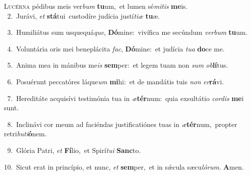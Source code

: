 \lettrine{\initial\textcolor{\initialcolor}{L}}{ucérna} pédibus meis ver\textit{bum} \textbf{tu}\-um,~\star et lumen sé\-\textit{mi}\-\textit{tis} \textbf{me}\-is.\\
{\numbfont\textcolor{\numbcolor}{~2.}}~Jurávi, \textit{et} \textbf{stá}\-tui~\star custodíre judícia justí\-\textit{ti}\-\textit{æ} \textbf{tu}\-æ.\par
{\numbfont\textcolor{\numbcolor}{~3.}}~Humiliátus sum usquequá\-\textit{que}\-, \textbf{Dó}\-mine:~\star vivífica me secúndum \textit{ver}\-\textit{bum} \textbf{tu}\-um.\par
{\numbfont\textcolor{\numbcolor}{~4.}}~Voluntária oris mei beneplácita \textit{fac}\-, \textbf{Dó}\-mine:~\star et judícia \textit{tu}\-\textit{a} \textbf{do}\-ce me.\par
{\numbfont\textcolor{\numbcolor}{~5.}}~Anima mea in mánibus me\textit{is} \textbf{sem}\-per:~\star et legem tuam non \textit{sum} \textit{ob}\-\textbf{lí}tus.\par
{\numbfont\textcolor{\numbcolor}{~6.}}~Posuérunt peccatóres láque\textit{um} \textbf{mi}\-hi:~\star et de mandátis tuis \textit{non} \textit{er}\-\textbf{rá}vi.\par
{\numbfont\textcolor{\numbcolor}{~7.}}~Hereditáte acquisívi testimónia tua in \textit{æ}\-\textbf{tér}num:~\star quia exsultátio \textit{cor}\-\textit{dis} \textbf{me}\-i sunt.\par
{\numbfont\textcolor{\numbcolor}{~8.}}~Inclinávi cor meum ad faciéndas justificatiónes tuas in \textit{æ}\-\textbf{tér}num,~\star propter retri\-\textit{bu}\-\textit{ti}\textbf{ó}nem.\par
{\numbfont\textcolor{\numbcolor}{~9.}}~Glória Patri, \textit{et} \textbf{Fí}\-lio,~\star et Spirí\-\textit{tu}\-\textit{i} \textbf{Sanc}\-to.\par
{\numbfont\textcolor{\numbcolor}{10.}}~Sicut erat in princípio, et nunc, \textit{et} \textbf{sem}\-per,~\star et in sǽcula sæcu\-\textit{ló}\-\textit{rum}. \textbf{A}\-men.\par
